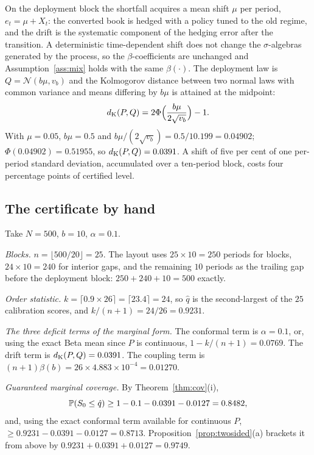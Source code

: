 \documentclass[../../../main.tex]{subfiles}
\begin{document}
On the deployment block the shortfall acquires a mean shift $\mu$ per period, $e_t=\mu+X_t$: the converted book is hedged with a policy tuned to the old regime, and the drift is the systematic component of the hedging error after the transition. A deterministic time-dependent shift does not change the $\sigma$-algebras generated by the process, so the $\beta$-coefficients are unchanged and Assumption~\ref{ass:mix} holds with the same $\beta(\cdot)$. The deployment law is $Q=\mathcal N(b\mu,v_b)$ and the Kolmogorov distance between two normal laws with common variance and means differing by $b\mu$ is attained at the midpoint:
\[
d_{\mathrm{K}}(P,Q)=2\Phi\Big(\frac{b\mu}{2\sqrt{v_b}}\Big)-1 .
\]
With $\mu=0.05$, $b\mu=0.5$ and $b\mu/(2\sqrt{v_b})=0.5/10.199=0.04902$; $\Phi(0.04902)=0.51955$, so $d_{\mathrm{K}}(P,Q)=0.0391$. A shift of five per cent of one per-period standard deviation, accumulated over a ten-period block, costs four percentage points of certified level.

\subsection{The certificate by hand}

Take $N=500$, $b=10$, $\alpha=0.1$.

\emph{Blocks.} $n=\lfloor500/20\rfloor=25$. The layout uses $25\times10=250$ periods for blocks, $24\times10=240$ for interior gaps, and the remaining $10$ periods as the trailing gap before the deployment block: $250+240+10=500$ exactly.

\emph{Order statistic.} $k=\lceil0.9\times26\rceil=\lceil23.4\rceil=24$, so $\hat q$ is the second-largest of the $25$ calibration scores, and $k/(n+1)=24/26=0.9231$.

\emph{The three deficit terms of the marginal form.} The conformal term is $\alpha=0.1$, or, using the exact Beta mean since $P$ is continuous, $1-k/(n+1)=0.0769$. The drift term is $d_{\mathrm{K}}(P,Q)=0.0391$. The coupling term is $(n+1)\beta(b)=26\times4.883\times10^{-4}=0.01270$.

\emph{Guaranteed marginal coverage.} By Theorem~\ref{thm:cov}(i),
\[
\mathbb{P}(S_0\le\hat q)\ge1-0.1-0.0391-0.0127=0.8482 ,
\]
and, using the exact conformal term available for continuous $P$, $\ge0.9231-0.0391-0.0127=0.8713$. Proposition~\ref{prop:twosided}(a) brackets it from above by $0.9231+0.0391+0.0127=0.9749$.
\end{document}
